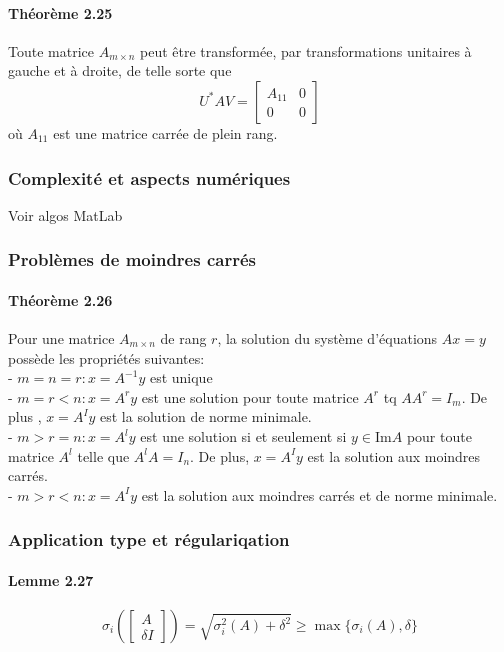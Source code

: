 \paragraph{Théorème 2.25} Toute matrice $A_{m\times n}$ peut être transformée, par transformations unitaires à gauche et à droite, de telle sorte que
$$ U^* A V = \begin{bmatrix}
A_{11} & 0 \\
0 & 0
\end{bmatrix} $$ où $A_{11}$ est une matrice carrée de plein rang.

\subsubsection{Complexité et aspects numériques}
Voir algos MatLab

\subsubsection{Problèmes de moindres carrés}

\paragraph{Théorème 2.26} Pour une matrice $A_{m\times n}$ de rang $r$, la solution du système d'équations $Ax=y$ possède les propriétés suivantes:\\
- $m=n=r : x = A^{-1}y$ est unique\\
- $m=r<n:x=A^ry$ est une solution pour toute matrice $A^r$ tq $AA^r = I_m$. De plus , $x=A^I y$ est la solution de norme minimale.\\
- $m>r=n : x = A^l y$ est une solution si et seulement si $y \in \text{Im} A$ pour toute matrice $A^l$ telle que $A^l A = I_n$. De plus, $x = A^Iy$ est la solution aux moindres carrés.\\
- $m>r<n: x = A^I y$ est la solution aux moindres carrés et de norme minimale.

\subsubsection{Application type et régulariqation}

\paragraph{Lemme 2.27}
$$\sigma_i \left( \begin{bmatrix}
A \\
\delta I
\end{bmatrix} \right) = \sqrt{\sigma_i^2(A) + \delta^2} \geq \max\{\sigma_i (A),\delta\}$$

